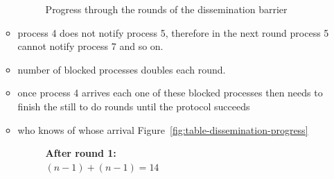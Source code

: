 \documentclass[a4paper, 10pt]{article}
\begin{document}
\begin{itemize}
\begin{itemize}
				\begin{figure}[htbp]
					\centering
					
					\caption{Progress through the rounds of the dissemination barrier}
					\label{fig:diagram-dissemination-progress}
				\end{figure}
			\item process 4 does not notify process 5, therefore in the next round process 5 cannot notify process 7 and so on.
			\item number of blocked processes doubles each round.
			\item once process 4 arrives each one of these blocked processes then needs to finish the still to do rounds until the protocol succeeds
			\item who knows of whose arrival Figure~\ref{fig:table-dissemination-progress}
				\begin{figure}[htbp]
					\centering
					\begin{minipage}[b]{0.4\linewidth}
						\textbf{After round 1:} \\
						$(n-1) + (n-1) = 14$ \\
						\vspace{-0.1cm} \\
\end{minipage}
\end{figure}
\end{itemize}
\end{itemize}
\end{document}
